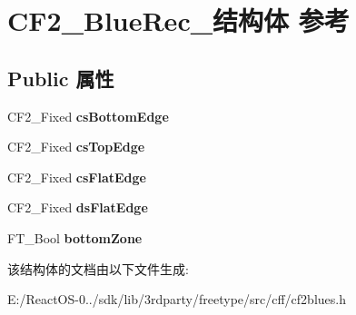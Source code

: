 \hypertarget{struct_c_f2___blue_rec__}{}\section{C\+F2\+\_\+\+Blue\+Rec\+\_\+结构体 参考}
\label{struct_c_f2___blue_rec__}
\subsection*{Public 属性}
\begin{DoxyCompactItemize}
\item 
\mbox{\label{struct_c_f2___blue_rec___a532506992d6f211b9832746fdfb9cb91}} 
C\+F2\+\_\+\+Fixed {\bfseries cs\+Bottom\+Edge}
\item 
\mbox{\label{struct_c_f2___blue_rec___af13ef694b3101f54ad1fc66f8633ee79}} 
C\+F2\+\_\+\+Fixed {\bfseries cs\+Top\+Edge}
\item 
\mbox{\label{struct_c_f2___blue_rec___abffbd735b33ab277942a151ec99c6a11}} 
C\+F2\+\_\+\+Fixed {\bfseries cs\+Flat\+Edge}
\item 
\mbox{\label{struct_c_f2___blue_rec___a370d9e029cae361fc9d4fe80a15c9636}} 
C\+F2\+\_\+\+Fixed {\bfseries ds\+Flat\+Edge}
\item 
\mbox{\label{struct_c_f2___blue_rec___a69885442fc085c422a80284c3b9639ae}} 
F\+T\+\_\+\+Bool {\bfseries bottom\+Zone}
\end{DoxyCompactItemize}


该结构体的文档由以下文件生成\+:\begin{DoxyCompactItemize}
\item 
E\+:/\+React\+O\+S-\/0../sdk/lib/3rdparty/freetype/src/cff/cf2blues.\+h\end{DoxyCompactItemize}
